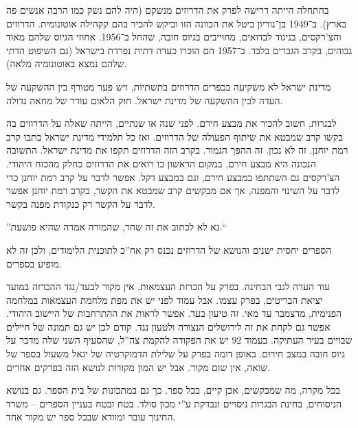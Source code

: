 \documentclass[]{../../../../tex/classes/styledArticle}
\begin{document}
	בהתחלה הייתה דרישה לפרק את הדרוזים מנשקם (היה להם נשק כמו הרבה אנשים פה בארץ). ב־1949 בן־גוריון ביטל את הכוונה הזו וביקש להכיר בהם קקהילה אוטונומית. הדרוזים והצ'רקסים, בניגוד לבדואים, מחוייבים בגיוס חובה, שהחל ב־1956. אחוזי הגיוס שלהם מאוד גבוהים, בקרב הגברים בלבד. ב־1957 הם הוכרו כעדה דתית נפרדת בישראל (גם השיפוט הדתי שלהם נמצא באוטונומיה מלאה). 
	
	מדינת ישראל לא משקיעה בכפרים הדרוזים בתשתיות, ויש פער מטורף בין ההשקעה של העדה לבין ההשקעה של מדינת ישראל. חוק הלאום עורר של מחאה גדולה. 
	
	לבגרות, חשוב להכיר את מבצע חירם. לפני שנה או שנתיים, הייתה שאלה על הדרוזים בה בקשו קרב שמבטא את שיתוף הפעולה של הדרוזים. ואז כל תלמידי מדינת ישראל כתבו קרב רמת יוחנן. זה לא נכון. זה ההפך הגמור. בקרב הזה הדרוזים תקפו את מדינת ישראל. התשובה הנכונה היא מבצע חירם, במקום הראשון בו רואים את הדרוזים כחלק מהכוח היהודי. הצ'רקסים גם השתתפו במבצע חירם, וגם במבצע דקל. אפשר לדבר על קרב רמת יוחנן כדי לדבר על השינוי והמפנה, אך אם מבקשים קרב שמבטא את הקשר, בקרב רמת יוחנן אפשר לדבר על הקשר רק כנקודת מפנה בקשר. 
	
	''נא לא לכתוב את זה שחר, שהמורה אמרה שהיא פושעת.``
	
	הספרים יחסית ישנים והנושא של הדרוזים נכנס רק אח''כ לתוכנית הלימודים, ולכן זה לא מופיע בספרים. 
	
	עוד הערה לגבי הבחינה. בפרק על הכרזת העצמאות, אין מקור לבעד/נגד ההכרזה במועד יציאת הבריטים, בפרק עצמו. אבל עמוד לפני יש את מפת מלחמת העצמאות במלחמה הפנימית, מדצמבר עד מאי. זה טיעון בעד. אפשר לראות את ההתרחבות של היישוב היהודי. אפשר גם לקחת את זה לירושלים הנצורה ולטעון נגד. קודם לכן יש גם תמונה של חיילים שבויים בעיר העתיקה. בעמוד 92 יש את הפקודה להקמת צה''ל, שהסעיף השני שלה מדבר על גיוס חובה במצב חירום. באופן דומה בפרק על שלילת הדמוקרטיה של יגאל משעול בספר של שואה, אין שום מקור. אבל יש המון מקורות לנושא הזה בפרקים אחרים. 
	
	בכל מקרה, מה שמבקשים, אכן קיים, בכל ספר. כך גם במתכונות של בית הספר. גם בנושא הניסוחים, בחינת הבגרות ניסויים ונבדקת ע''י מכון סולד. בטח ובטח בעניין הספרים – משרד החינוך עובר ומוודא שבכל ספר יש מקור אחד. 
	
\end{document}
